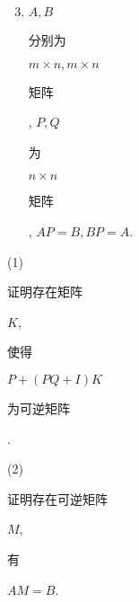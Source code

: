 \documentclass[10pt]{article}
\begin{document}
\begin{enumerate}
  \setcounter{enumi}{2}
  \item $A, B$ \begin{CJK}{UTF8}{mj}分别为\end{CJK} $m \times n, m \times n$ \begin{CJK}{UTF8}{mj}矩阵\end{CJK}, $P, Q$ \begin{CJK}{UTF8}{mj}为\end{CJK} $n \times n$ \begin{CJK}{UTF8}{mj}矩阵\end{CJK}, $A P=B, B P=A$.
\end{enumerate}
(1) \begin{CJK}{UTF8}{mj}证明存在矩阵\end{CJK} $K$, \begin{CJK}{UTF8}{mj}使得\end{CJK} $P+(P Q+I) K$ \begin{CJK}{UTF8}{mj}为可逆矩阵\end{CJK}.

(2) \begin{CJK}{UTF8}{mj}证明存在可逆矩阵\end{CJK} $M$, \begin{CJK}{UTF8}{mj}有\end{CJK} $A M=B$.
\end{document}
